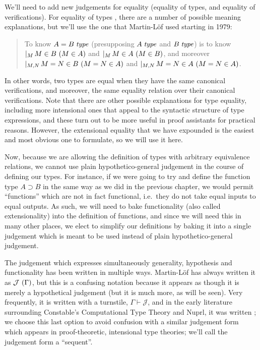 \documentclass[main.tex]{subfiles}
\begin{document}
We'll need to add new judgements for equality (equality of types, and
equality of verifications). For equality of types
, there are a number of possible meaning
explanations, but we'll use the one that Martin-L\"of used starting in
1979:

\begin{quote}
  To know $A=B\;\mathit{type}$ (presupposing $A\;\mathit{type}$ and $B\;\mathit{type}$) is to know
$\lvert_{M}\,M\in B\ (M\in A)$ and
$\lvert_{M}\,M\in A\ (M\in B)$, and moreover
$\lvert_{M,N}\,M=N\in B\ (M=N\in A)$ and
$\lvert_{M,N}\,M=N\in A\ (M=N\in A)$.
\end{quote}

In other words, two types are equal when they have the same canonical
verifications, and moreover, the same equality relation over their canonical
verifications. Note that there are other possible explanations for type
equality, including more intensional ones that appeal to the syntactic
structure of type expressions, and these turn out to be more useful in proof
assistants for practical reasons. However, the extensional equality that we
have expounded is the easiest and most obvious one to formulate, so we will
use it here.

Now, because we are allowing the definition of types with arbitrary equivalence
relations, we cannot use plain hypothetico-general judgement in the course of
defining our types. For instance, if we were going to try and define the
function type $A\supset B$ in the same way as we did in the previous chapter,
we would permit ``functions'' which are not in fact functional, i.e.\ they do
not take equal inputs to equal outputs. As such, we will need to bake
functionality (also called extensionality) into the definition of functions,
and since we will need this in many other places, we elect to simplify our
definitions by baking it into a single judgement which is meant to be used
instead of plain hypothetico-general judgement.

The judgement which expresses simultaneously generality, hypothesis and
functionality has been written in multiple ways. Martin-L\"of has always
written it as $\mathcal{J}\ (\Gamma)$, but this is a confusing notation
because it appears as though it is merely a hypothetical judgement (but it is
much more, as will be seen). Very frequently, it is written with a turnstile,
$\Gamma\vdash\mathcal{J}$, and in the early literature surrounding Constable's
Computational Type Theory and Nuprl, it was written
; we choose this last option to avoid
confusion with a similar judgement form which appears in proof-theoretic,
intensional type theories; we'll call the judgement form a ``sequent''.
\end{document}
